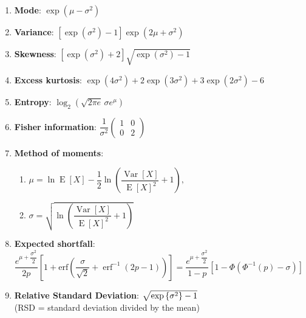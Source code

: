 \begin{enumerate}
    \item \textbf{Mode}: ${\displaystyle \exp \left(\mu -\sigma ^{2}\right)}$
    \hfill \cite{wiki/Log-normal_distribution}

    \item \textbf{Variance}: 
    ${\displaystyle \left[\exp(\sigma ^{2})-1\right]\exp \left(2\mu +\sigma ^{2}\right)}$
    \hfill \cite{wiki/Log-normal_distribution}

    \item \textbf{Skewness}:
    ${\displaystyle \left[\exp \left(\sigma ^{2}\right)+2\right]{\sqrt {\exp(\sigma ^{2})-1}}}$
    \hfill \cite{wiki/Log-normal_distribution}

    \item \textbf{Excess kurtosis}: 
    ${\displaystyle \exp \left(4\sigma ^{2}\right)+2\exp \left(3\sigma ^{2}\right)+3\exp \left(2\sigma ^{2}\right)-6}$
    \hfill \cite{wiki/Log-normal_distribution}

    \item \textbf{Entropy}: ${\displaystyle \log _{2}\left({\sqrt {2\pi e}}\,\sigma e^{\mu }\right)}$
    \hfill \cite{wiki/Log-normal_distribution}

    \item \textbf{Fisher information}: 
    ${\displaystyle {\dfrac {1}{\sigma ^{2}}}{\begin{pmatrix}1&0\\0&2\end{pmatrix}}}$
    \hfill \cite{wiki/Log-normal_distribution}

    \item \textbf{Method of moments}:
    \begin{enumerate}
        \item ${\displaystyle \mu =\ln \operatorname {E} [X]-{\dfrac {1}{2}}\ln \left({\dfrac {\operatorname {Var} [X]}{\operatorname {E} [X]^{2}}}+1\right),}$
        \hfill \cite{wiki/Log-normal_distribution}

        \item ${\displaystyle \sigma ={\sqrt {\ln \left({\dfrac {\operatorname {Var} [X]}{\operatorname {E} [X]^{2}}}+1\right)}}}$
        \hfill \cite{wiki/Log-normal_distribution}
    \end{enumerate}

    \item \textbf{Expected shortfall}:
    $
        {\displaystyle {{\dfrac {e^{\mu +{\dfrac {\sigma ^{2}}{2}}}}{2p}}\left[1+\text{erf} \left({\dfrac {\sigma }{\sqrt {2}}}+\operatorname {erf} ^{-1}(2p-1)\right)\right]
        ={\dfrac {e^{\mu +{\dfrac {\sigma ^{2}}{2}}}}{1-p}}\left[1-\Phi (\Phi ^{-1}(p)-\sigma )\right]}}
    $
    \hfill \cite{wiki/Log-normal_distribution}

    \item \textbf{Relative Standard Deviation}: $\sqrt{\exp\left\{\sigma^2\right\} - 1}$
    \hfill \cite{statistics/book/Statistics-for-Data-Scientists/Maurits-Kaptein}
    \\
    (RSD = standard deviation divided by the mean)
    \hfill \cite{statistics/book/Statistics-for-Data-Scientists/Maurits-Kaptein}
\end{enumerate}





